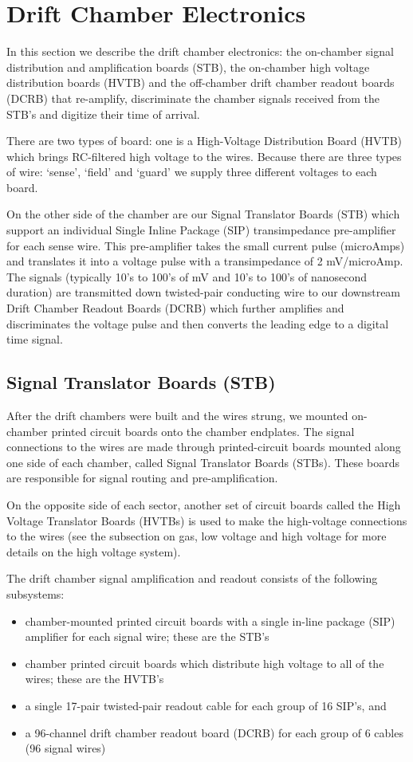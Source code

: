 \section{Drift Chamber Electronics}
In this section we describe the drift chamber electronics:
the on-chamber signal distribution and amplification boards (STB),
the on-chamber high voltage distribution boards (HVTB) and the
off-chamber drift chamber readout boards (DCRB) that re-amplify,
discriminate the chamber signals received from the STB's and
digitize their time of arrival.  

There are two types of board: one is a High-Voltage Distribution Board (HVTB)
which brings RC-filtered high voltage to the wires.  Because there are three
types of wire: `sense', `field' and `guard' we supply three different voltages
to each board.  

On the other side of the chamber are our Signal Translator Boards (STB) 
which support an individual Single Inline Package (SIP) transimpedance
pre-amplifier for each sense wire.  This pre-amplifier takes the
small current pulse (microAmps) and translates it into a voltage 
pulse with a transimpedance of 2 mV/microAmp.  The signals (typically
10's to 100's of mV and 10's to 100's of nanosecond duration) are
transmitted down twisted-pair conducting wire to our downstream
Drift Chamber Readout Boards (DCRB) which further amplifies and
discriminates the voltage pulse and then converts the leading edge
to a digital time signal.

\subsection{Signal Translator Boards (STB)}
After the drift chambers were built and the wires strung, we mounted
on-chamber printed circuit boards onto the chamber endplates.
The signal connections to the wires are made through printed-circuit 
boards mounted along one side of each chamber, called Signal Translator 
Boards (STBs).  These boards are responsible for signal routing and 
pre-amplification.  

On the opposite side of each sector, another set of 
circuit boards called the High Voltage Translator Boards (HVTBs) is used 
to make the high-voltage connections to the wires (see the subsection
on gas, low voltage and high voltage for more details on the high
voltage system).

The drift chamber signal amplification and readout consists of the 
following subsystems:
\begin{itemize}
\item  chamber-mounted printed circuit boards with a single in-line package
(SIP) amplifier for each signal wire; these are the STB's
\item  chamber printed circuit boards which distribute high voltage
to all of the wires; these are the HVTB's
\item a single 17-pair twisted-pair readout cable for each group of 16
SIP's, and
\item a 96-channel drift chamber readout board (DCRB) for each group
of 6 cables (96 signal wires)
\end{itemize}


